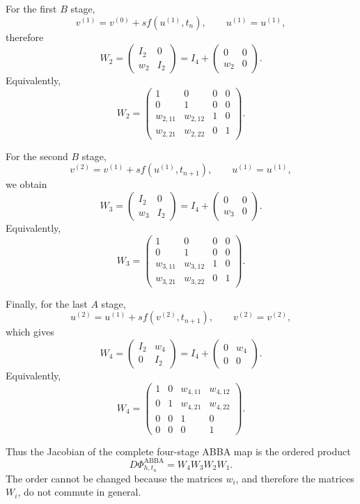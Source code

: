 \documentclass[11pt,a4paper]{article}
\newcommand{\PhiAB}{\Phi^{\mathrm{ABBA}}_{h,t_n}}
\begin{document}
For the first $B$ stage,
\[
 v^{(1)}=v^{(0)}+s f(u^{(1)},t_n),
 \qquad
 u^{(1)}=u^{(1)},
\]
therefore
\[
 \boxed{
 W_2=
 \begin{pmatrix}
 I_2&0\\
 w_2&I_2
 \end{pmatrix}
 =I_4+
 \begin{pmatrix}
 0&0\\
 w_2&0
 \end{pmatrix}.
 }
 \tag{7b}
\]
Equivalently,
\[
 W_2=
 \begin{pmatrix}
 1&0&0&0\\
 0&1&0&0\\
 w_{2,11}&w_{2,12}&1&0\\
 w_{2,21}&w_{2,22}&0&1
 \end{pmatrix}.
\]

For the second $B$ stage,
\[
 v^{(2)}=v^{(1)}+s f(u^{(1)},t_{n+1}),
 \qquad
 u^{(1)}=u^{(1)},
\]
we obtain
\[
 \boxed{
 W_3=
 \begin{pmatrix}
 I_2&0\\
 w_3&I_2
 \end{pmatrix}
 =I_4+
 \begin{pmatrix}
 0&0\\
 w_3&0
 \end{pmatrix}.
 }
 \tag{7c}
\]
Equivalently,
\[
 W_3=
 \begin{pmatrix}
 1&0&0&0\\
 0&1&0&0\\
 w_{3,11}&w_{3,12}&1&0\\
 w_{3,21}&w_{3,22}&0&1
 \end{pmatrix}.
\]

Finally, for the last $A$ stage,
\[
 u^{(2)}=u^{(1)}+s f(v^{(2)},t_{n+1}),
 \qquad
 v^{(2)}=v^{(2)},
\]
which gives
\[
 \boxed{
 W_4=
 \begin{pmatrix}
 I_2&w_4\\
 0&I_2
 \end{pmatrix}
 =I_4+
 \begin{pmatrix}
 0&w_4\\
 0&0
 \end{pmatrix}.
 }
 \tag{7d}
\]
Equivalently,
\[
 W_4=
 \begin{pmatrix}
 1&0&w_{4,11}&w_{4,12}\\
 0&1&w_{4,21}&w_{4,22}\\
 0&0&1&0\\
 0&0&0&1
 \end{pmatrix}.
\]

Thus the Jacobian of the complete four-stage ABBA map is the ordered product
\[
 \boxed{
 D\PhiAB=W_4W_3W_2W_1.
 }
 \tag{8}
\]
The order cannot be changed because the matrices $w_i$, and therefore the matrices
$W_i$, do not commute in general.
\end{document}

